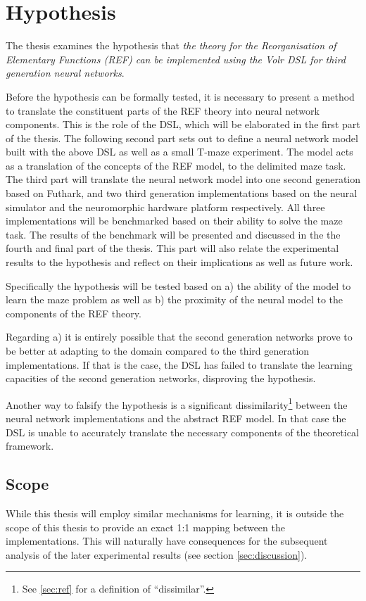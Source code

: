 \documentclass[report.tex]{subfiles}
\begin{document}
\section{Hypothesis} \label{ref:hypothesis}
The thesis examines the hypothesis that 
\textit{the theory for the Reorganisation of Elementary Functions
(\gls{REF}) can be implemented using the Volr DSL for third generation
neural networks}.

Before the hypothesis can be formally tested, it is necessary to
present a method to translate the constituent parts of the \gls{REF} theory
into neural network components.
This is the role of the \gls{DSL}, which will be elaborated
in the first part of the thesis.
The following second part sets out to define a neural network
model built with the above \gls{DSL} as well as a small T-maze experiment. 
The model acts as a translation of the concepts of the \gls{REF} model,
to the delimited maze task.
The third part will translate the neural network model 
into one second generation based on Futhark, and two third
generation implementations based on the neural simulator  and 
the neuromorphic hardware platform  respectively.
All three implementations will be benchmarked based on their ability 
to solve the maze task.
The results of the benchmark will be presented and discussed in the the
fourth and final part of the thesis.
This part will also relate the experimental results to the
hypothesis and reflect on their implications as well as future work.

Specifically the hypothesis will be tested based on
a) the ability of the model to learn the maze problem as well as 
b) the proximity of the neural model to the components of the
\gls{REF} theory.

Regarding a) it is entirely possible that the second generation networks prove
to be better at adapting to the domain compared to the third generation
implementations.
If that is the case, the \gls{DSL} has failed to translate
the learning capacities of the second generation networks, disproving the
hypothesis.

Another way to falsify the hypothesis is a significant
dissimilarity\footnote{See \ref{sec:ref} for a definition of
\enquote{dissimilar}.} between the neural network implementations 
and the abstract \gls{REF} model. 
In that case the \gls{DSL} is unable to accurately translate the
necessary components of the theoretical framework.

\subsection{Scope} \label{sec:scope}
While this thesis will employ similar mechanisms for learning, 
it is outside the scope of this thesis to provide an exact 1:1 mapping
between the implementations.
This will naturally have consequences for the subsequent analysis of the
later experimental results (see section \ref{sec:discussion}).
\end{document}
